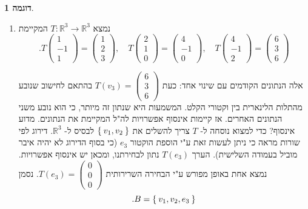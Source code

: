 \documentclass[12pt]{report}
\theoremstyle{plain}
\theoremstyle{definition}
\newtheorem{example}{דוגמה}[chapter]
\newcommand{\R}{\mathbb{R}}
\newcommand{\0}{\mathbf{0}}
\begin{document}
\begin{example}
\begin{enumerate}[label=\alph*.]
\item
נמצא
$T:\R^3\to\R^3$
המקיימת
$$
.T\begin{pmatrix}1\\-1\\1\end{pmatrix}=\begin{pmatrix}1\\2\\3\end{pmatrix},\quad T\begin{pmatrix}2\\1\\0\end{pmatrix}=\begin{pmatrix}4\\-1\\0\end{pmatrix},\quad T\begin{pmatrix}4\\-1\\2\end{pmatrix}=\begin{pmatrix}6\\3\\6\end{pmatrix}
$$

אלה הנתונים הקודמים עם שינוי אחד: כעת
$T(v_3)=\begin{pmatrix}6\\3\\6\end{pmatrix}$ 
בהתאם לחישוב שנובע מהתלות הלינארית בין וקטורי הקלט. המשמעות היא שנתון זה מיותר, כי הוא נובע משני הנתונים האחרים. אז קיימות אינסוף אפשרויות לה"ל המקיימת את הנתונים. מדוע אינסוף? כדי למצוא נוסחה ל-
$T$
צריך להשלים את
$\Set{v_1,v_2}$
לבסיס ל-
$\R^3$.
דירוג לפי שורות מראה כי ניתן לעשות זאת ע"י הוספת הוקטור
$e_3$
(כי בסוף הדירוג לא יהיה איבר מוביל בעמודה השלישית).
הערך 
$T(e_3)$
נתון לבחירתנו, ומכאן יש אינסוף אפשרויות. נמצא אחת באופן מפורש ע"י הבחירה השרירותית
$T(e_3)=\begin{pmatrix}0\\0\\0\end{pmatrix}$.
נסמן
$$
.B=\Set{v_1,v_2,e_3}
$$


\end{enumerate}
\end{example}
\end{document}
